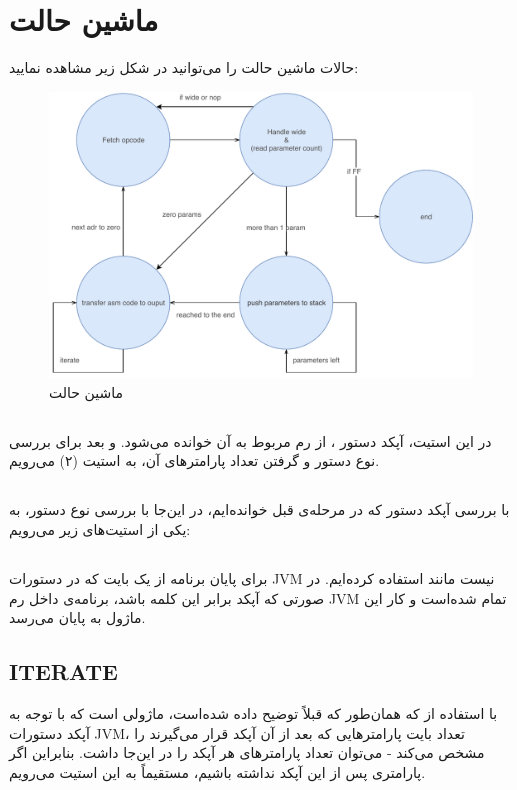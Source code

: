 \section*{
ماشین حالت
}
حالات ماشین حالت را می‌توانید در شکل زیر مشاهده نمایید:
\begin{figure}[H]
	\centering
	\includegraphics[width=0.9\linewidth]{SM}
	\caption{ماشین حالت}
	\label{fig:sm}
\end{figure}
\subsection*{}
در این استیت، آپکد دستور 
،
 از رم مربوط به آن خوانده می‌شود. و بعد برای بررسی نوع دستور و گرفتن تعداد پارامترهای آن، به استیت (۲) می‌رویم. 

\subsection*{}

با بررسی آپکد دستور که در مرحله‌ی قبل خوانده‌ایم، در این‌جا با بررسی نوع دستور، به یکی از استیت‌های زیر می‌رویم:
\subsection*{}
برای پایان برنامه از یک بایت که در دستورات JVM نیست
 مانند
استفاده کرده‌ایم. در صورتی که آپکد برابر این کلمه باشد، برنامه‌ی داخل رم JVM تمام شده‌است و کار این ماژول به پایان می‌رسد. 
\subsection*{ITERATE}
با استفاده از
که همان‌طور که قبلاً توضیح داده شده‌است، ماژولی است که با توجه به آپکد دستورات JVM، تعداد بایت پارامترهایی که بعد از آن آپکد قرار می‌گیرند را مشخص می‌کند - می‌توان تعداد پارامترهای هر آپکد را در این‌جا داشت. بنابراین اگر پارامتری پس از این آپکد نداشته باشیم، مستقیماً به این استیت می‌رویم.